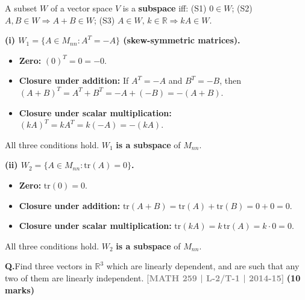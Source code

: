 \documentclass[12pt,a3paper]{article}
\newcommand{\yr}[1]{\hfill\textcolor{gray}{\small\textbf{[#1]}}}
\newcommand{\mk}[1]{\textcolor{orange!70!black}{\small\textbf{(#1 marks)}}}
\newcounter{qnum}
\newcommand{\Q}[1]{%
  \needspace{4\baselineskip}
  \refstepcounter{qnum}
  \vspace{6pt}
  \noindent\textbf{Q\theqnum.}\enspace #1\par
}
\begin{document}
\begin{tcolorbox}[enhanced,breakable,colback=cC!4,colframe=cC,
  boxrule=0.8pt,arc=5pt,
  title={\textbf{Answer}},
  fonttitle=\bfseries\color{white},colbacktitle=cC]

A subset $W$ of a vector space $V$ is a \textbf{subspace} iff: (S1) $0\in W$; (S2) $A,B\in W\Rightarrow A+B\in W$; (S3) $A\in W,\,k\in\mathbb{R}\Rightarrow kA\in W$.

\medskip
\textbf{(i) $W_1 = \{A\in M_{nn} : A^T = -A\}$ (skew-symmetric matrices).}

\begin{itemize}[itemsep=2pt]
  \item \textbf{Zero:} $(0)^T = 0 = -0$. \checkmark
  \item \textbf{Closure under addition:} If $A^T=-A$ and $B^T=-B$, then $(A+B)^T = A^T+B^T = -A+(-B) = -(A+B)$. \checkmark
  \item \textbf{Closure under scalar multiplication:} $(kA)^T = kA^T = k(-A) = -(kA)$. \checkmark
\end{itemize}
All three conditions hold. $W_1$ \textbf{is a subspace} of $M_{nn}$.

\medskip
\textbf{(ii) $W_2 = \{A\in M_{nn} : \mathrm{tr}(A) = 0\}$.}

\begin{itemize}[itemsep=2pt]
  \item \textbf{Zero:} $\mathrm{tr}(0) = 0$. \checkmark
  \item \textbf{Closure under addition:} $\mathrm{tr}(A+B)=\mathrm{tr}(A)+\mathrm{tr}(B)=0+0=0$. \checkmark
  \item \textbf{Closure under scalar multiplication:} $\mathrm{tr}(kA)=k\,\mathrm{tr}(A)=k\cdot 0=0$. \checkmark
\end{itemize}
All three conditions hold. $W_2$ \textbf{is a subspace} of $M_{nn}$.
\end{tcolorbox}

\Q{Find three vectors in $\mathbb{R}^3$ which are linearly dependent, and are such that any two of them are linearly independent.
\yr{MATH 259 | L-2/T-1 | 2014-15} \mk{10}}
\end{document}
